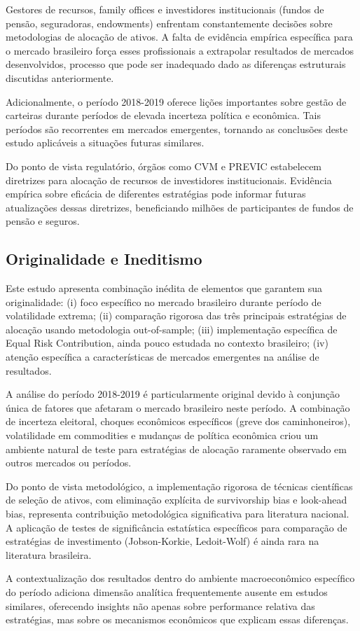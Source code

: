Gestores de recursos, family offices e investidores institucionais (fundos de pensão, seguradoras, endowments) enfrentam constantemente decisões sobre metodologias de alocação de ativos. A falta de evidência empírica específica para o mercado brasileiro força esses profissionais a extrapolar resultados de mercados desenvolvidos, processo que pode ser inadequado dado as diferenças estruturais discutidas anteriormente.

Adicionalmente, o período 2018-2019 oferece lições importantes sobre gestão de carteiras durante períodos de elevada incerteza política e econômica. Tais períodos são recorrentes em mercados emergentes, tornando as conclusões deste estudo aplicáveis a situações futuras similares.

Do ponto de vista regulatório, órgãos como CVM e PREVIC estabelecem diretrizes para alocação de recursos de investidores institucionais. Evidência empírica sobre eficácia de diferentes estratégias pode informar futuras atualizações dessas diretrizes, beneficiando milhões de participantes de fundos de pensão e seguros.

\subsection{Originalidade e Ineditismo}

Este estudo apresenta combinação inédita de elementos que garantem sua originalidade: (i) foco específico no mercado brasileiro durante período de volatilidade extrema; (ii) comparação rigorosa das três principais estratégias de alocação usando metodologia out-of-sample; (iii) implementação específica de Equal Risk Contribution, ainda pouco estudada no contexto brasileiro; (iv) atenção específica a características de mercados emergentes na análise de resultados.

A análise do período 2018-2019 é particularmente original devido à conjunção única de fatores que afetaram o mercado brasileiro neste período. A combinação de incerteza eleitoral, choques econômicos específicos (greve dos caminhoneiros), volatilidade em commodities e mudanças de política econômica criou um ambiente natural de teste para estratégias de alocação raramente observado em outros mercados ou períodos.

Do ponto de vista metodológico, a implementação rigorosa de técnicas científicas de seleção de ativos, com eliminação explícita de survivorship bias e look-ahead bias, representa contribuição metodológica significativa para literatura nacional. A aplicação de testes de significância estatística específicos para comparação de estratégias de investimento (Jobson-Korkie, Ledoit-Wolf) é ainda rara na literatura brasileira.

A contextualização dos resultados dentro do ambiente macroeconômico específico do período adiciona dimensão analítica frequentemente ausente em estudos similares, oferecendo insights não apenas sobre performance relativa das estratégias, mas sobre os mecanismos econômicos que explicam essas diferenças.
